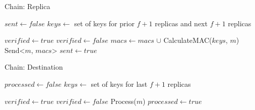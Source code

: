 {\begin{algorithm}
	\caption{Chain: Replica}\label{chain2}
	\begin{algorithmic}[1]
			\State $sent \gets false$
			\State $keys \gets$ set of keys for prior $f + 1$ replicas and next $f + 1$ replicas
		\EndFunction
		\State
		
			\State $verified \gets true$
						$verified \gets false$ 
					\EndIf
				\EndFor
						\State $macs \gets macs$ $\cup$ CalculateMAC($keys$, $m$)
					\EndFor
					\State Send<$m$, $macs$>
					\State $sent \gets true$
				\EndIf
			\EndIf
		\EndFunction
		\State
	\end{algorithmic}
\end{algorithm}

\begin{algorithm}
	\caption{Chain: Destination}\label{chain3}
	\begin{algorithmic}[1]
			\State $processed \gets false$
			\State $keys \gets$ set of keys for last $f + 1$ replicas
		\EndFunction
		\State
		
			\State $verified \gets true$
						$verified \gets false$ 
					\EndIf
				\EndFor
					\State Process($m$)
					\State $processed \gets true$
				\EndIf
			\EndIf
		\EndFunction
		\State
	\end{algorithmic}
\end{algorithm}
}